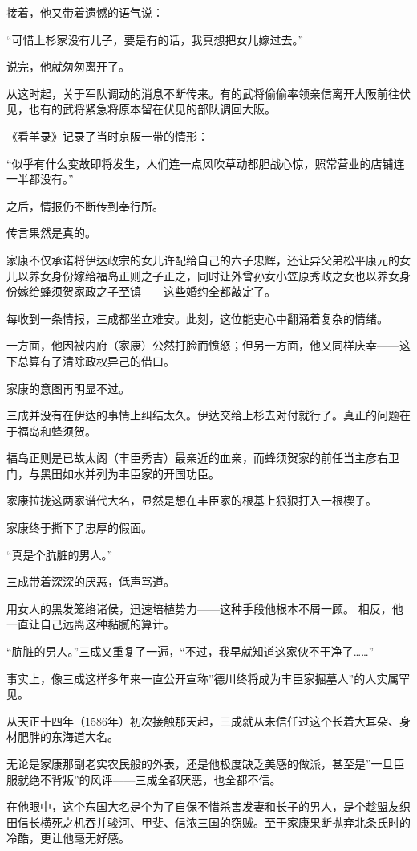 \documentclass[
]{article}
\begin{document}
接着，他又带着遗憾的语气说：

``可惜上杉家没有儿子，要是有的话，我真想把女儿嫁过去。''

说完，他就匆匆离开了。

从这时起，关于军队调动的消息不断传来。有的武将偷偷率领亲信离开大阪前往伏见，也有的武将紧急将原本留在伏见的部队调回大阪。

《看羊录》记录了当时京阪一带的情形：

``似乎有什么变故即将发生，人们连一点风吹草动都胆战心惊，照常营业的店铺连一半都没有。''

之后，情报仍不断传到奉行所。

传言果然是真的。

家康不仅承诺将伊达政宗的女儿许配给自己的六子忠辉，还让异父弟松平康元的女儿以养女身份嫁给福岛正则之子正之，同时让外曾孙女小笠原秀政之女也以养女身份嫁给蜂须贺家政之子至镇------这些婚约全都敲定了。

每收到一条情报，三成都坐立难安。此刻，这位能吏心中翻涌着复杂的情绪。

一方面，他因被内府（家康）公然打脸而愤怒；但另一方面，他又同样庆幸------这下总算有了清除政权异己的借口。

家康的意图再明显不过。

三成并没有在伊达的事情上纠结太久。伊达交给上杉去对付就行了。真正的问题在于福岛和蜂须贺。

福岛正则是已故太阁（丰臣秀吉）最亲近的血亲，而蜂须贺家的前任当主彦右卫门，与黑田如水并列为丰臣家的开国功臣。

家康拉拢这两家谱代大名，显然是想在丰臣家的根基上狠狠打入一根楔子。

家康终于撕下了忠厚的假面。

``真是个肮脏的男人。''

三成带着深深的厌恶，低声骂道。

用女人的黑发笼络诸侯，迅速培植势力------这种手段他根本不屑一顾。 相反，他一直让自己远离这种黏腻的算计。

``肮脏的男人。''三成又重复了一遍，``不过，我早就知道这家伙不干净了\ldots\ldots{}''

事实上，像三成这样多年来一直公开宣称''德川终将成为丰臣家掘墓人''的人实属罕见。

从天正十四年（1586年）初次接触那天起，三成就从未信任过这个长着大耳朵、身材肥胖的东海道大名。

无论是家康那副老实农民般的外表，还是他极度缺乏美感的做派，甚至是''一旦臣服就绝不背叛''的风评------三成全都厌恶，也全都不信。

在他眼中，这个东国大名是个为了自保不惜杀害发妻和长子的男人，是个趁盟友织田信长横死之机吞并骏河、甲斐、信浓三国的窃贼。至于家康果断抛弃北条氏时的冷酷，更让他毫无好感。
\end{document}

